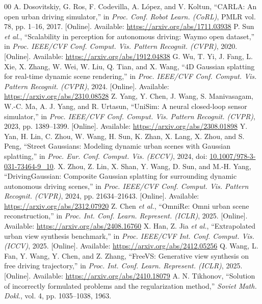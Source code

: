 \begin{thebibliography}{00}
 A. Dosovitskiy, G. Ros, F. Codevilla, A. López, and V. Koltun, ``CARLA: An open urban driving simulator,'' in \textit{Proc. Conf. Robot Learn. (CoRL)}, PMLR vol. 78, pp. 1--16, 2017. [Online]. Available: \url{https://arxiv.org/abs/1711.03938}
 P. Sun \textit{et al.}, ``Scalability in perception for autonomous driving: Waymo open dataset,'' in \textit{Proc. IEEE/CVF Conf. Comput. Vis. Pattern Recognit. (CVPR)}, 2020. [Online]. Available: \url{https://arxiv.org/abs/1912.04838}
 G. Wu, T. Yi, J. Fang, L. Xie, X. Zhang, W. Wei, W. Liu, Q. Tian, and X. Wang, ``4D Gaussian splatting for real-time dynamic scene rendering,'' in \textit{Proc. IEEE/CVF Conf. Comput. Vis. Pattern Recognit. (CVPR)}, 2024. [Online]. Available: \url{https://arxiv.org/abs/2310.08528}
 Z. Yang, Y. Chen, J. Wang, S. Manivasagam, W.-C. Ma, A. J. Yang, and R. Urtasun, ``UniSim: A neural closed-loop sensor simulator,'' in \textit{Proc. IEEE/CVF Conf. Comput. Vis. Pattern Recognit. (CVPR)}, 2023, pp. 1389--1399. [Online]. Available: \url{https://arxiv.org/abs/2308.01898}
 Y. Yan, H. Lin, C. Zhou, W. Wang, H. Sun, K. Zhan, X. Lang, X. Zhou, and S. Peng, ``Street Gaussians: Modeling dynamic urban scenes with Gaussian splatting,'' in \textit{Proc. Eur. Conf. Comput. Vis. (ECCV)}, 2024, doi: \href{https://doi.org/10.1007/978-3-031-73464-9_10}{10.1007/978-3-031-73464-9\_10}.
 X. Zhou, Z. Lin, X. Shan, Y. Wang, D. Sun, and M.-H. Yang, ``DrivingGaussian: Composite Gaussian splatting for surrounding dynamic autonomous driving scenes,'' in \textit{Proc. IEEE/CVF Conf. Comput. Vis. Pattern Recognit. (CVPR)}, 2024, pp. 21634--21643. [Online]. Available: \url{https://arxiv.org/abs/2312.07920}
 Z. Chen \textit{et al.}, ``OmniRe: Omni urban scene reconstruction,'' in \textit{Proc. Int. Conf. Learn. Represent. (ICLR)}, 2025. [Online]. Available: \url{https://arxiv.org/abs/2408.16760}
 X. Han, Z. Jia \textit{et al.}, ``Extrapolated urban view synthesis benchmark,'' in \textit{Proc. IEEE/CVF Int. Conf. Comput. Vis. (ICCV)}, 2025. [Online]. Available: \url{https://arxiv.org/abs/2412.05256}
 Q. Wang, L. Fan, Y. Wang, Y. Chen, and Z. Zhang, ``FreeVS: Generative view synthesis on free driving trajectory,'' in \textit{Proc. Int. Conf. Learn. Represent. (ICLR)}, 2025. [Online]. Available: \url{https://arxiv.org/abs/2410.18079}
 A. N. Tikhonov, ``Solution of incorrectly formulated problems and the regularization method,'' \textit{Soviet Math. Dokl.}, vol. 4, pp. 1035--1038, 1963.

\end{thebibliography}
